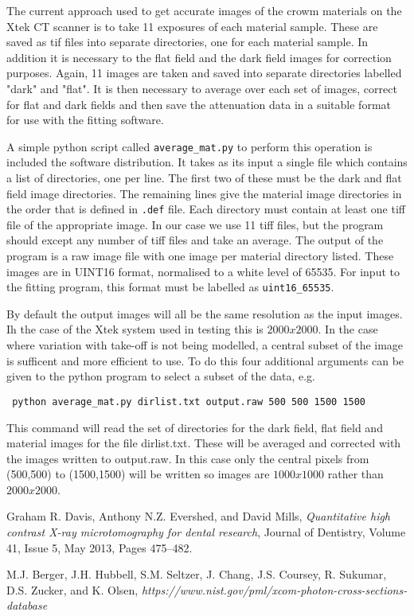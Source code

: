 \documentclass[a4paper,12pt]{article}
\begin{document}
The current approach used to get accurate images of the crowm materials on the
Xtek CT scanner is to take 11 exposures of each material sample.
These are saved as tif files into separate directories, one for each material sample.
In addition it is necessary to the flat field and the dark field images for correction
purposes.
Again, 11 images are taken and saved into separate directories labelled "dark" and "flat".
It is then necessary to average over each set of images, correct for flat and dark fields
and then save the attenuation data in a suitable format for use with the fitting software.

A simple python script called \texttt{average\_mat.py} to perform this operation is
included the software distribution.
It takes as its input a single file which contains a list of directories, one per line.
The first two of these must be the dark and flat field image directories.
The remaining lines give the material image directories in the order that is defined in
\texttt{.def} file.
Each directory must contain at least one tiff file of the appropriate image.
In our case we use 11 tiff files, but the program should except any number of tiff files
and take an average.
The output of the program is a raw image file with one image per material directory listed.
These images are in UINT16 format, normalised to a white level of 65535.
For input to the fitting program, this format must be labelled as \texttt{uint16\_65535}.

By default the output images will all be the same resolution as the input images.
Ih the case of the Xtek system used in testing this is $2000x2000$.
In the case where variation with take-off is not being modelled, a central subset of the
image is sufficent and more efficient to use.
To do this four additional arguments can be given to the python program to select a
subset of the data, e.g.

\texttt{ python average\_mat.py dirlist.txt output.raw 500 500 1500 1500 }

This command will read the set of directories for the dark field, flat field and material
images for the file dirlist.txt. These will be averaged and corrected with the images written
to output.raw. In this case only the central pixels from (500,500) to (1500,1500) will
be written so images are $1000x1000$ rather than $2000x2000$.

\begin{thebibliography}{9}

  Graham R. Davis, Anthony N.Z. Evershed, and David Mills,
  \emph{Quantitative high contrast X-ray microtomography for dental research},
  Journal of Dentistry,
  Volume 41, Issue 5, May 2013, Pages 475–482.

  M.J. Berger, J.H. Hubbell, S.M. Seltzer, J. Chang, J.S. Coursey, R. Sukumar, D.S. Zucker, and K. Olsen,
  \emph{https://www.nist.gov/pml/xcom-photon-cross-sections-database}

\end{thebibliography}
\end{document}
